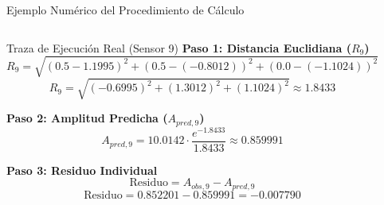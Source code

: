 \begin{frame}{Ejemplo Numérico del Procedimiento de Cálculo}
\begin{columns}[T]
\begin{exampleblock}{Traza de Ejecución Real (Sensor 9)}
            \vspace{0.15cm}
            \textbf{Paso 1: Distancia Euclidiana ($R_9$)}
            \[
                R_9 = \sqrt{(0.5-1.1995)^2 + (0.5-(-0.8012))^2 + (0.0-(-1.1024))^2}
            \]
            \[
                R_9 = \sqrt{(-0.6995)^2 + (1.3012)^2 + (1.1024)^2} \approx 1.8433
            \]

            \vspace{0.1cm}
            \textbf{Paso 2: Amplitud Predicha ($A_{pred,9}$)}
            \[
                A_{pred,9} = 10.0142 \cdot \frac{e^{-1.8433}}{1.8433} \approx 0.859991
            \]

            \vspace{0.1cm}
            \textbf{Paso 3: Residuo Individual}
            \[
                \text{Residuo} = A_{obs,9} - A_{pred,9}
            \]
            \[
                \text{Residuo} = 0.852201 - 0.859991 = -0.007790
            \]
        \end{exampleblock}

    \end{columns}

\end{frame}